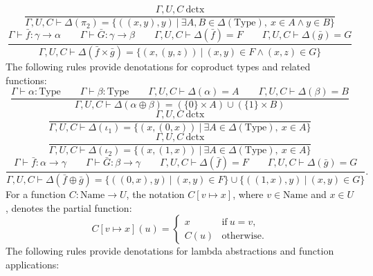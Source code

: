 \documentclass[11pt]{article}
\begin{document}
\begin{equation}
	\frac{\Gamma,U,C\ \text{dctx}}
	{\Gamma,U,C \vdash \Delta(\pi_2) =
	\{((x,y),y)\ |\ \exists A, B \in \Delta(\text{Type}),
	\ x \in A \wedge y \in B\}}
\end{equation}
\begin{equation}
	\frac{\Gamma \vdash \bar{f} : \gamma \to \alpha
	\qquad \Gamma \vdash \bar{G} : \gamma \to \beta
	\qquad \Gamma,U,C \vdash \Delta(\bar{f}) = F
	\qquad \Gamma,U,C \vdash \Delta(\bar{g}) = G}
	{\Gamma,U,C \vdash \Delta(\bar{f} \times \bar{g}) =
	\{(x,(y,z))\ |\ (x,y) \in F \wedge (x,z) \in G\}}
\end{equation}
The following rules provide denotations for coproduct types
and related functions:
\begin{equation}
	\frac{\Gamma \vdash \alpha : \text{Type}
	\qquad \Gamma \vdash \beta : \text{Type}
	\qquad \Gamma,U,C \vdash \Delta(\alpha) = A
	\qquad \Gamma,U,C \vdash \Delta(\beta) = B}
	{\Gamma,U,C \vdash \Delta(\alpha \oplus \beta) =
	(\{0\} \times A) \cup (\{1\} \times B)}
\end{equation}
\begin{equation}
	\frac{\Gamma,U,C\ \text{dctx}}
	{\Gamma,U,C \vdash \Delta(\iota_1) =
	\{(x,(0,x))\ |\ \exists A \in \Delta(\text{Type}),\ x \in A\}}
\end{equation}
\begin{equation}
	\frac{\Gamma,U,C\ \text{dctx}}
	{\Gamma,U,C \vdash \Delta(\iota_2) =
	\{(x,(1,x))\ |\ \exists A \in \Delta(\text{Type}),\ x \in A\}}
\end{equation}
\begin{equation}
	\frac{\Gamma \vdash \bar{f} : \alpha \to \gamma
	\qquad \Gamma \vdash \bar{G} : \beta \to \gamma
	\qquad \Gamma,U,C \vdash \Delta(\bar{f}) = F
	\qquad \Gamma,U,C \vdash \Delta(\bar{g}) = G}
	{\Gamma,U,C \vdash \Delta(\bar{f} \oplus \bar{g}) =
	\{((0,x),y)\ |\ (x,y) \in F\}
	\cup \{((1,x),y)\ |\ (x,y) \in G\}}.
\end{equation}
For a function $C : \text{Name} \to U$, the notation
$C[v \mapsto x]$, where $v \in \text{Name}$ and $x \in U$,
denotes the partial function:
\begin{equation}
	C[v \mapsto x](u) = \begin{cases}
		x & \text{if}\ u = v, \\
		C(u) & \text{otherwise}.
	\end{cases}
\end{equation}
The following rules provide denotations for lambda abstractions
and function applications:
\end{document}
